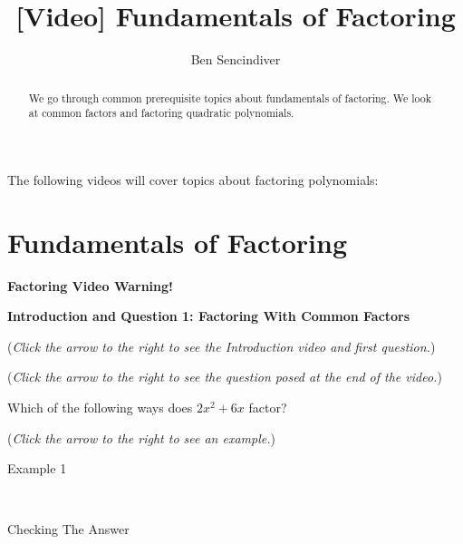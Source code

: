 \documentclass{ximera}
\title[Prerequisite Videos: ]{[Video] Fundamentals of Factoring}
\author{Ben Sencindiver}
\begin{document}
\begin{abstract}
  We go through common prerequisite topics about fundamentals of factoring. 
  We look at common factors and factoring quadratic polynomials.
\end{abstract}
\maketitle

The following videos will cover topics about factoring polynomials: 

\section{Fundamentals of Factoring}
\textbf{Factoring Video Warning!}


\textbf{Introduction and Question 1: Factoring With Common Factors}
\begin{question}
\begin{flushright}
{\color{blue}(\emph{Click the arrow to the right to see the Introduction video and first question.})}
\end{flushright}
\begin{center}
\begin{expandable}
\begin{flushright}
{\color{blue}(\emph{Click the arrow to the right to see the  question
posed at the end of the video.})}
\end{flushright}
\begin{expandable}
Which of the following ways does $2x^2 + 6x$ factor?
\begin{multipleChoice}
\end{multipleChoice}
\begin{flushright}
{\color{blue}(\emph{Click the arrow to the right to see an example.})}
\end{flushright}
\begin{expandable}
\begin{center}
Example 1
\end{center}
\\
\begin{center}
Checking The Answer
\end{center}
\end{expandable}
\end{expandable}
\end{expandable}
\end{center}
\end{question}
\end{document}
